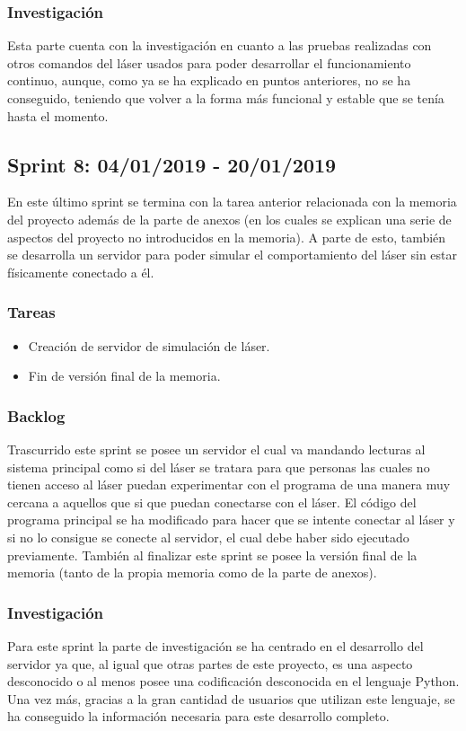 \subsubsection{Investigación}
Esta parte cuenta con la investigación en cuanto a las pruebas realizadas con otros comandos del láser usados para poder desarrollar el funcionamiento continuo, aunque, como ya se ha explicado en puntos anteriores, no se ha conseguido, teniendo que volver a la forma más funcional y estable que se tenía hasta el momento.

\subsection{Sprint 8: 04/01/2019 - 20/01/2019}
En este último sprint se termina con la tarea anterior relacionada con la memoria del proyecto además de la parte de anexos (en los cuales se explican una serie de aspectos del proyecto no introducidos en la memoria). A parte de esto, también se desarrolla un servidor para poder simular el comportamiento del láser sin estar físicamente conectado a él.
\subsubsection{Tareas}
\begin{itemize}
	\item Creación de servidor de simulación de láser.
	\item Fin de versión final de la memoria.
\end{itemize}
\subsubsection{Backlog}
Trascurrido este sprint se posee un servidor el cual va mandando lecturas al sistema principal como si del láser se tratara para que personas las cuales no tienen acceso al láser puedan experimentar con el programa de una manera muy cercana a aquellos que si que puedan conectarse con el láser. El código del programa principal se ha modificado para hacer que se intente conectar al láser y si no lo consigue se conecte al servidor, el cual debe haber sido ejecutado previamente. También al finalizar este sprint se posee la versión final de la memoria (tanto de la propia memoria como de la parte de anexos).
\subsubsection{Investigación}
Para este sprint la parte de investigación se ha centrado en el desarrollo del servidor ya que, al igual que otras partes de este proyecto, es una aspecto desconocido o al menos posee una codificación desconocida en el lenguaje Python. Una vez más, gracias a la gran cantidad de usuarios que utilizan este lenguaje, se ha conseguido la información necesaria para este desarrollo completo.

